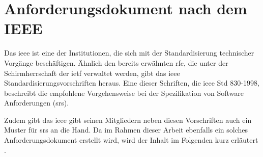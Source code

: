 \section{Anforderungsdokument nach dem IEEE}
Das \ac{ieee} ist eine der Institutionen, die sich mit der Standardisierung technischer Vorgänge beschäftigen. Ähnlich den bereits erwähnten \ac{rfc}, die unter der Schirmherrschaft der \ac{ietf} verwaltet werden, gibt das \ac{ieee} Standardisierungsvorschriften heraus. Eine dieser Schriften, die \ac{ieee} Std 830-1998, beschreibt die empfohlene Vorgehensweise bei der Spezifikation von Software Anforderungen (\ac{srs}).

Zudem gibt das \ac{ieee} gibt seinen Mitgliedern neben diesen Vorschriften auch ein Muster für \ac{srs} an die Hand. Da im Rahmen dieser Arbeit ebenfalls ein solches Anforderungsdokument erstellt wird, wird der Inhalt im Folgenden kurz erläutert \citep[vgl.][S. 11 ff.]{ieee1998}.
